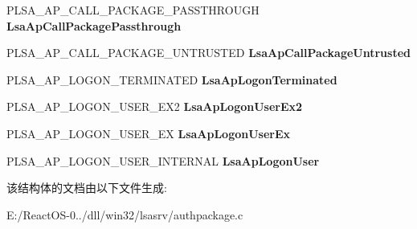 \begin{DoxyCompactItemize}
P\+L\+S\+A\+\_\+\+A\+P\+\_\+\+C\+A\+L\+L\+\_\+\+P\+A\+C\+K\+A\+G\+E\+\_\+\+P\+A\+S\+S\+T\+H\+R\+O\+U\+GH {\bfseries Lsa\+Ap\+Call\+Package\+Passthrough}
\item 
\mbox{\label{struct___a_u_t_h___p_a_c_k_a_g_e_a1b7ba63fd7546ec99e5d4907d529590f}} 
P\+L\+S\+A\+\_\+\+A\+P\+\_\+\+C\+A\+L\+L\+\_\+\+P\+A\+C\+K\+A\+G\+E\+\_\+\+U\+N\+T\+R\+U\+S\+T\+ED {\bfseries Lsa\+Ap\+Call\+Package\+Untrusted}
\item 
\mbox{\label{struct___a_u_t_h___p_a_c_k_a_g_e_a8faf54a51bc7decb4032888b43cc4c8a}} 
P\+L\+S\+A\+\_\+\+A\+P\+\_\+\+L\+O\+G\+O\+N\+\_\+\+T\+E\+R\+M\+I\+N\+A\+T\+ED {\bfseries Lsa\+Ap\+Logon\+Terminated}
\item 
\mbox{\label{struct___a_u_t_h___p_a_c_k_a_g_e_a13c913047b9315abe47151d2b466c7b6}} 
P\+L\+S\+A\+\_\+\+A\+P\+\_\+\+L\+O\+G\+O\+N\+\_\+\+U\+S\+E\+R\+\_\+\+E\+X2 {\bfseries Lsa\+Ap\+Logon\+User\+Ex2}
\item 
\mbox{\label{struct___a_u_t_h___p_a_c_k_a_g_e_a4794cf66f32bf9b578c8d00e4a066118}} 
P\+L\+S\+A\+\_\+\+A\+P\+\_\+\+L\+O\+G\+O\+N\+\_\+\+U\+S\+E\+R\+\_\+\+EX {\bfseries Lsa\+Ap\+Logon\+User\+Ex}
\item 
\mbox{\label{struct___a_u_t_h___p_a_c_k_a_g_e_a1fe66484844003627571376b75c5fdb4}} 
P\+L\+S\+A\+\_\+\+A\+P\+\_\+\+L\+O\+G\+O\+N\+\_\+\+U\+S\+E\+R\+\_\+\+I\+N\+T\+E\+R\+N\+AL {\bfseries Lsa\+Ap\+Logon\+User}
\end{DoxyCompactItemize}


该结构体的文档由以下文件生成\+:\begin{DoxyCompactItemize}
\item 
E\+:/\+React\+O\+S-\/0../dll/win32/lsasrv/authpackage.\+c\end{DoxyCompactItemize}
